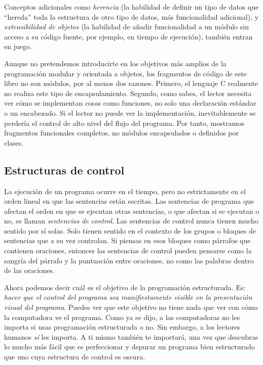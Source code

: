 \documentclass[10pt,a4paper]{book}
\begin{document}
\medskip

Conceptos adicionales como \textit{herencia} (la habilidad de definir un tipo de datos que “hereda” toda la estructura de otro tipo de datos, más funcionalidad adicional), y \textit{extensibilidad de objetos} (la habilidad de añadir funcionalidad a un módulo sin acceso a su código fuente, por ejemplo, en tiempo de ejecución), también entran en juego.

\medskip

Aunque no pretendemos introducirte en los objetivos más amplios de la programación modular y orientada a objetos, los fragmentos de código de este libro no son módulos, por al menos dos razones. Primero, el lenguaje C realmente no realiza este tipo de encapsulamiento. Segundo, como sabes, el lector necesita ver cómo se implementan cosas como funciones, no solo una declaración estándar o un encabezado. Si el lector no puede ver la implementación, inevitablemente se perdería el control de alto nivel del flujo del programa. Por tanto, mostramos fragmentos funcionales completos, no módulos encapsulados o definidos por clases.

\subsection{Estructuras de control}

La ejecución de un programa ocurre en el tiempo, pero no estrictamente en el orden lineal en que las sentencias están escritas. Las sentencias de programa que afectan el orden en que se ejecutan otras sentencias, o que afectan si se ejecutan o no, se llaman \textit{sentencias de control}. Las sentencias de control nunca tienen mucho sentido por sí solas. Solo tienen sentido en el contexto de los grupos o bloques de sentencias que a su vez controlan. Si piensas en esos bloques como párrafos que contienen oraciones, entonces las sentencias de control pueden pensarse como la sangría del párrafo y la puntuación entre oraciones, no como las palabras dentro de las oraciones.

\medskip

Ahora podemos decir cuál es el objetivo de la programación estructurada. Es: \textit{hacer que el control del programa sea manifiestamente visible en la presentación visual del programa}. Puedes ver que este objetivo no tiene nada que ver con cómo la computadora ve el programa. Como ya se dijo, a las computadoras no les importa si usas programación estructurada o no. Sin embargo, a los lectores humanos \textit{sí} les importa. A ti mismo también te importará, una vez que descubras lo mucho más fácil que es perfeccionar y depurar un programa bien estructurado que uno cuya estructura de control es oscura.
\end{document}
